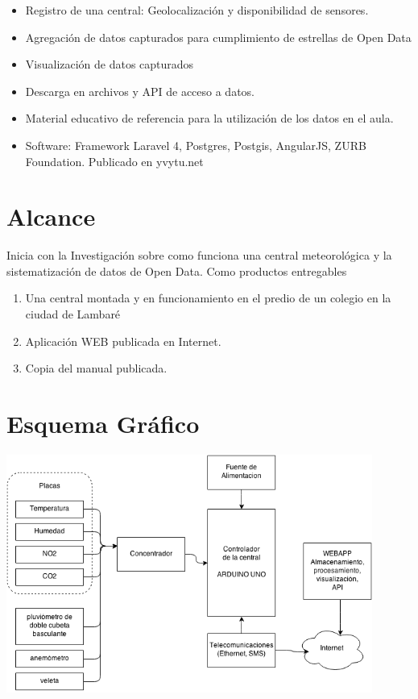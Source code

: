 \documentclass[11pt, spanish]{report}
\begin{document}
\begin{enumerate}
\begin{itemize}
\item Registro de una central: Geolocalización y disponibilidad de sensores.
\item Agregación de datos capturados para cumplimiento de estrellas de Open Data
\item Visualización de datos capturados
\item Descarga en archivos y API de acceso a datos.
\item Material educativo de referencia para la utilización de los datos en el aula.
\item Software: Framework Laravel 4, Postgres, Postgis, AngularJS, ZURB Foundation. Publicado en yvytu.net
\end{itemize}
\end{enumerate}

\section{Alcance}
Inicia con la Investigación sobre como funciona una central meteorológica y la sistematización de datos de Open Data. 
Como productos entregables
\begin{enumerate}
\item Una central montada y en funcionamiento en el predio de un colegio en la ciudad de Lambaré
\item Aplicación WEB publicada en Internet.
\item Copia del manual publicada.
\end{enumerate}

\section{Esquema Gráfico}
\includegraphics[width=0.9\textwidth,natwidth=648,natheight=421]{Central.png}
\end{document}
